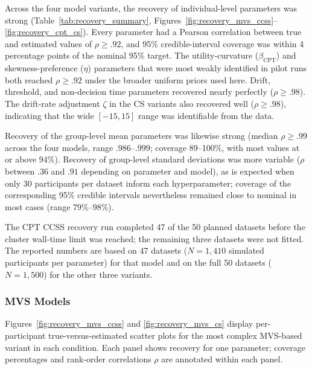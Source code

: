 \documentclass[man,floatsintext]{apa7}
\begin{document}
Across the four model variants, the recovery of individual-level parameters was strong (Table~\ref{tab:recovery_summary}, Figures~\ref{fig:recovery_mvs_ccss}--\ref{fig:recovery_cpt_cs}). Every parameter had a Pearson correlation between true and estimated values of $\rho \geq .92$, and 95\% credible-interval coverage was within 4 percentage points of the nominal 95\% target. The utility-curvature ($\beta_{\text{CPT}}$) and skewness-preference ($\eta$) parameters that were most weakly identified in pilot runs both reached $\rho \geq .92$ under the broader uniform priors used here. Drift, threshold, and non-decision time parameters recovered nearly perfectly ($\rho \geq .98$). The drift-rate adjustment $\zeta$ in the CS variants also recovered well ($\rho \geq .98$), indicating that the wide $[-15, 15]$ range was identifiable from the data.

Recovery of the group-level mean parameters was likewise strong (median $\rho \geq .99$ across the four models, range $.986$--$.999$; coverage 89--100\%, with most values at or above 94\%). Recovery of group-level standard deviations was more variable ($\rho$ between $.36$ and $.91$ depending on parameter and model), as is expected when only 30 participants per dataset inform each hyperparameter; coverage of the corresponding 95\% credible intervals nevertheless remained close to nominal in most cases (range 79\%--98\%).

The CPT CCSS recovery run completed 47 of the 50 planned datasets before the cluster wall-time limit was reached; the remaining three datasets were not fitted. The reported numbers are based on 47 datasets ($N = 1{,}410$ simulated participants per parameter) for that model and on the full 50 datasets ($N = 1{,}500$) for the other three variants.

\subsubsection{MVS Models}

Figures~\ref{fig:recovery_mvs_ccss} and \ref{fig:recovery_mvs_cs} display per-participant true-versus-estimated scatter plots for the most complex MVS-based variant in each condition. Each panel shows recovery for one parameter; coverage percentages and rank-order correlations $\rho$ are annotated within each panel.
\end{document}
